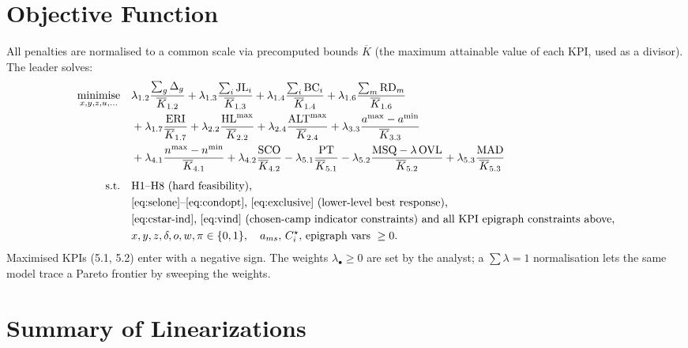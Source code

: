 \documentclass[12pt, letterpaper]{article}
\DeclareMathOperator*{\minimise}{minimise}
\begin{document}
\section{Objective Function}

All penalties are normalised to a common scale via precomputed bounds
$\overline{K}$ (the maximum attainable value of each KPI, used as a
divisor). The leader solves:
\begin{align}
\minimise_{x,y,z,u,\dots}\quad
& \lambda_{1.2}\frac{\sum_g\Delta_g}{\overline{K}_{1.2}}
+ \lambda_{1.3}\frac{\sum_i\mathrm{JL}_i}{\overline{K}_{1.3}}
+ \lambda_{1.4}\frac{\sum_i\mathrm{BC}_i}{\overline{K}_{1.4}}
+ \lambda_{1.6}\frac{\sum_m\mathrm{RD}_m}{\overline{K}_{1.6}}
\notag\\
& + \lambda_{1.7}\frac{\mathrm{ERI}}{\overline{K}_{1.7}}
+ \lambda_{2.2}\frac{\mathrm{HL}^{\max}}{\overline{K}_{2.2}}
+ \lambda_{2.4}\frac{\mathrm{ALT}^{\max}}{\overline{K}_{2.4}}
+ \lambda_{3.3}\frac{a^{\max}-a^{\min}}{\overline{K}_{3.3}}
\notag\\
& + \lambda_{4.1}\frac{n^{\max}-n^{\min}}{\overline{K}_{4.1}}
+ \lambda_{4.2}\frac{\mathrm{SCO}}{\overline{K}_{4.2}}
- \lambda_{5.1}\frac{\mathrm{PT}}{\overline{K}_{5.1}}
- \lambda_{5.2}\frac{\mathrm{MSQ}-\lambda\,\mathrm{OVL}}{\overline{K}_{5.2}}
+ \lambda_{5.3}\frac{\mathrm{MAD}}{\overline{K}_{5.3}}
\\[4pt]
\text{s.t.}\quad
& \text{H1--H8 (hard feasibility),}\notag\\
& \text{\eqref{eq:selone}--\eqref{eq:condopt}, \eqref{eq:exclusive} (lower-level best response),}
  \notag\\
& \text{\eqref{eq:cstar-ind}, \eqref{eq:vind} (chosen-camp indicator
  constraints) and all KPI epigraph constraints above,}\notag\\
& x,y,z,\delta,o,w,\pi\in\{0,1\},\quad
  a_{ms},\,C_i^\star,\,\text{epigraph vars}\ \ge 0.
\notag
\end{align}
Maximised KPIs (5.1, 5.2) enter with a negative sign. The weights
$\lambda_\bullet\ge0$ are set by the analyst; a $\sum\lambda=1$
normalisation lets the same model trace a Pareto frontier by sweeping the
weights.

\section{Summary of Linearizations}
\label{sec:nonlinkpi}
\end{document}

